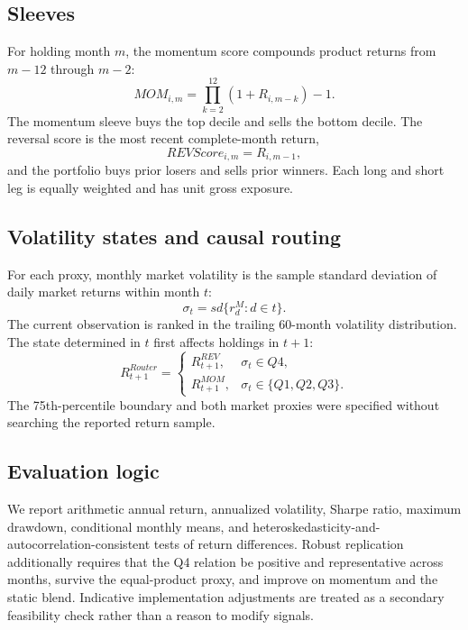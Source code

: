 \subsection{Sleeves}

For holding month $m$, the momentum score compounds product returns from $m-12$ through
$m-2$:
\begin{equation}
  MOM_{i,m}=\prod_{k=2}^{12}(1+R_{i,m-k})-1.
\end{equation}
The momentum sleeve buys the top decile and sells the bottom decile. The reversal score
is the most recent complete-month return,
\begin{equation}
  REVScore_{i,m}=R_{i,m-1},
\end{equation}
and the portfolio buys prior losers and sells prior winners. Each long and short leg is
equally weighted and has unit gross exposure.

\subsection{Volatility states and causal routing}

For each proxy, monthly market volatility is the sample standard deviation of daily
market returns within month $t$:
\begin{equation}
  \sigma_t=sd\{r^M_d:d\in t\}.
\end{equation}
The current observation is ranked in the trailing 60-month volatility distribution. The
state determined in $t$ first affects holdings in $t+1$:
\begin{equation}
R^{Router}_{t+1}=
\begin{cases}
R^{REV}_{t+1}, & \sigma_t\in Q4,\\
R^{MOM}_{t+1}, & \sigma_t\in\{Q1,Q2,Q3\}.
\end{cases}
\label{eq:router}
\end{equation}
The 75th-percentile boundary and both market proxies were specified without searching the
reported return sample.

\subsection{Evaluation logic}

We report arithmetic annual return, annualized volatility, Sharpe ratio, maximum
drawdown, conditional monthly means, and heteroskedasticity-and-autocorrelation-consistent
tests of return differences. Robust replication additionally requires that the Q4
relation be positive and representative across months, survive the equal-product proxy,
and improve on momentum and the static blend. Indicative implementation adjustments are
treated as a secondary feasibility check rather than a reason to modify signals.
